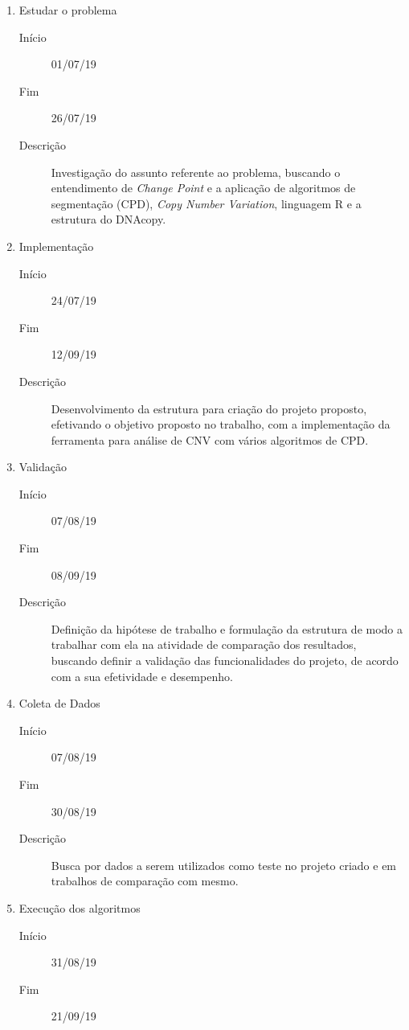 \begin{enumerate}
   \item Estudar o problema
   \begin{description}
        \item[Início] 01/07/19
        \item[Fim] 26/07/19
        \item[Descrição] Investigação do assunto referente ao problema, buscando o entendimento de \textit{Change Point} e a aplicação de algoritmos de segmentação (CPD), \textit{Copy Number Variation}, linguagem R e a estrutura do DNAcopy.
    \end{description}
   \item Implementação
   \begin{description}
        \item[Início] 24/07/19
        \item[Fim] 12/09/19
        \item[Descrição] Desenvolvimento da estrutura para criação do projeto proposto, efetivando o objetivo proposto no trabalho, com a implementação da ferramenta para análise de CNV com vários algoritmos de CPD.
    \end{description}
   \item Validação
   \begin{description}
        \item[Início] 07/08/19
        \item[Fim] 08/09/19
        \item[Descrição] Definição da hipótese de trabalho e formulação da estrutura de modo a trabalhar com ela na atividade de comparação dos resultados, buscando definir a validação das funcionalidades do projeto, de acordo com a sua efetividade e desempenho.
    \end{description}
   \item Coleta de Dados
   \begin{description}
        \item[Início] 07/08/19
        \item[Fim] 30/08/19
        \item[Descrição] Busca por dados a serem utilizados como teste no projeto criado e em trabalhos de comparação com mesmo.
    \end{description}
   \item Execução dos algoritmos
   \begin{description}
        \item[Início] 31/08/19
        \item[Fim] 21/09/19

\end{description}
\end{enumerate}
